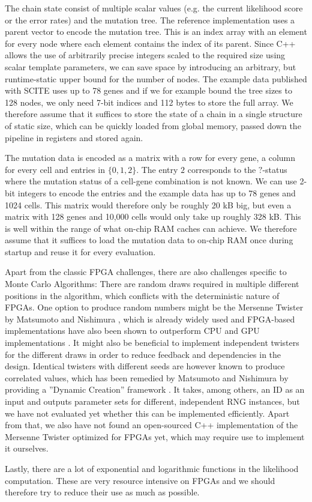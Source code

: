The chain state consist of multiple scalar values (e.g. the current likelihood score or the error rates) and the mutation tree. The reference implementation uses a parent vector to encode the mutation tree. This is an index array with an element for every node where each element contains the index of its parent. Since C++ allows the use of arbitrarily precise integers scaled to the required size using scalar template parameters, we can save space by introducing an arbitrary, but runtime-static upper bound for the number of nodes. The example data published with \ac{SCITE} uses up to 78 genes and if we for example bound the tree sizes to 128 nodes, we only need 7-bit indices and 112 bytes to store the full array. We therefore assume that it suffices to store the state of a chain in a single structure of static size, which can be quickly loaded from global memory, passed down the pipeline in registers and stored again.

The mutation data is encoded as a matrix with a row for every gene, a column for every cell and entries in $\{0, 1, 2\}$. The entry $2$ corresponds to the $?$-status where the mutation status of a cell-gene combination is not known. We can use 2-bit integers to encode the entries and the example data has up to 78 genes and 1024 cells. This matrix would therefore only be roughly 20 kB big, but even a matrix with 128 genes and 10,000 cells would only take up roughly 328 kB. This is well within the range of what on-chip RAM caches can achieve. We therefore assume that it suffices to load the mutation data to on-chip RAM once during startup and reuse it for every evaluation.

Apart from the classic \ac{FPGA} challenges, there are also challenges specific to Monte Carlo Algorithms: There are random draws required in multiple different positions in the algorithm, which conflicts with the deterministic nature of \acp{FPGA}. One option to produce random numbers might be the Mersenne Twister by Matsumoto and Nishimura \cite{matsumoto1998mersenne}, which is already widely used and \ac{FPGA}-based implementations have also been shown to outperform CPU and GPU implementations \cite{tian2009mersenne}. It might also be beneficial to implement independent twisters for the different draws in order to reduce feedback and dependencies in the design. Identical twisters with different seeds are however known to produce correlated values, which has been remedied by Matsumoto and Nishimura by providing a ''Dynamic Creation'' framework \cite{matsumoto2000dynamic}. It takes, among others, an ID as an input and outputs parameter sets for different, independent \ac{RNG} instances, but we have not evaluated yet whether this can be implemented efficiently. Apart from that, we also have not found an open-sourced C++ implementation of the Mersenne Twister optimized for FPGAs yet, which may require use to implement it ourselves.

Lastly, there are a lot of exponential and logarithmic functions in the likelihood computation. These are very resource intensive on \acp{FPGA} and we should therefore try to reduce their use as much as possible.
